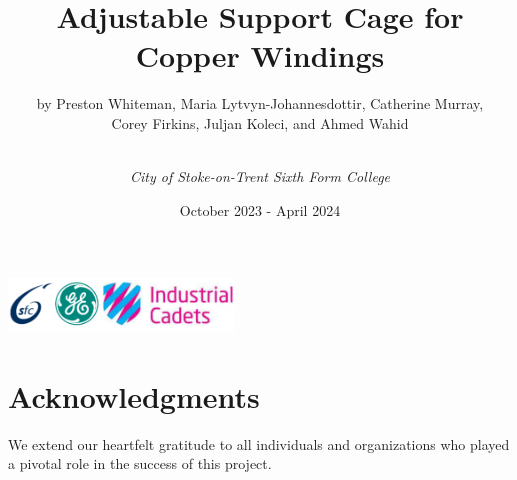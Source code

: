 \documentclass[a4paper,10pt]{article}
\title{\textbf{Adjustable Support Cage for Copper Windings}}
\author{by Preston Whiteman, Maria Lytvyn-Johannesdottir, Catherine Murray, \\ Corey Firkins, Juljan Koleci, and Ahmed Wahid\and \\ \textit{City of Stoke-on-Trent Sixth Form College}}
\date{October 2023 - April 2024}
\begin{document}

\maketitle
\begin{center}
    \includegraphics[width = 6cm, height = 1.5cm]{logos.png}
\end{center}
\pagebreak



\tableofcontents
\pagebreak



\section{Acknowledgments}
We extend our heartfelt gratitude to all individuals and organizations who played a pivotal role in the success of this project.
\end{document}
